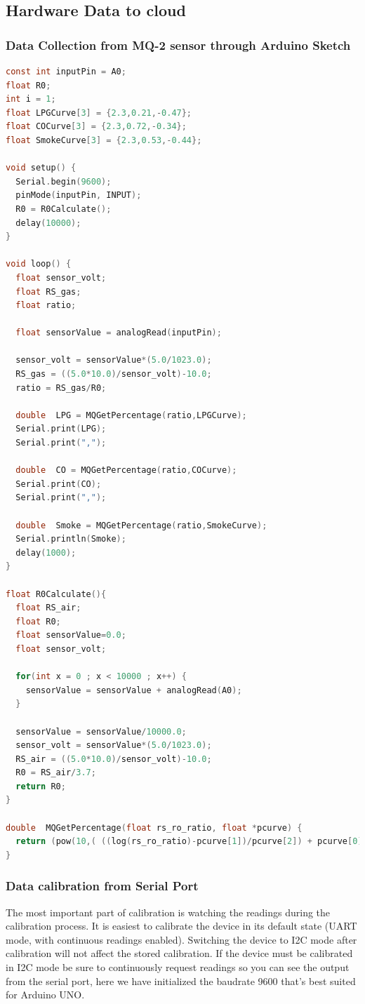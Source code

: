 \subsection{Hardware Data to cloud}

\subsubsection{Data Collection from MQ-2 sensor through Arduino Sketch}

\begin{lstlisting}[language=C, caption= Data calibration from MQ-2 Sensor]
const int inputPin = A0;
float R0;
int i = 1;
float LPGCurve[3] = {2.3,0.21,-0.47}; 
float COCurve[3] = {2.3,0.72,-0.34};
float SmokeCurve[3] = {2.3,0.53,-0.44}; 

void setup() {
  Serial.begin(9600);
  pinMode(inputPin, INPUT); 
  R0 = R0Calculate();
  delay(10000);
}

void loop() {
  float sensor_volt;
  float RS_gas; 
  float ratio; 

  float sensorValue = analogRead(inputPin); 
  
  sensor_volt = sensorValue*(5.0/1023.0);
  RS_gas = ((5.0*10.0)/sensor_volt)-10.0; 
  ratio = RS_gas/R0;  
  
  double  LPG = MQGetPercentage(ratio,LPGCurve);
  Serial.print(LPG);
  Serial.print(",");
  
  double  CO = MQGetPercentage(ratio,COCurve);
  Serial.print(CO);
  Serial.print(",");

  double  Smoke = MQGetPercentage(ratio,SmokeCurve);
  Serial.println(Smoke);
  delay(1000);
}

float R0Calculate(){
  float RS_air; 
  float R0;
  float sensorValue=0.0;
  float sensor_volt;
  
  for(int x = 0 ; x < 10000 ; x++) {
    sensorValue = sensorValue + analogRead(A0);
  }

  sensorValue = sensorValue/10000.0;
  sensor_volt = sensorValue*(5.0/1023.0); 
  RS_air = ((5.0*10.0)/sensor_volt)-10.0;
  R0 = RS_air/3.7;
  return R0;
}

double  MQGetPercentage(float rs_ro_ratio, float *pcurve) {
  return (pow(10,( ((log(rs_ro_ratio)-pcurve[1])/pcurve[2]) + pcurve[0])));
}

\end{lstlisting}


\subsubsection{Data calibration from Serial Port}
The most important part of calibration is watching the readings during the calibration process. It is easiest to calibrate the device in its default state (UART mode, with continuous readings enabled). Switching the device to I2C mode after calibration will not affect the stored calibration. If the device must be calibrated in I2C mode be sure to continuously request readings so you can see the output from the serial port, here we have initialized the baudrate 9600 that's best suited for Arduino UNO.

